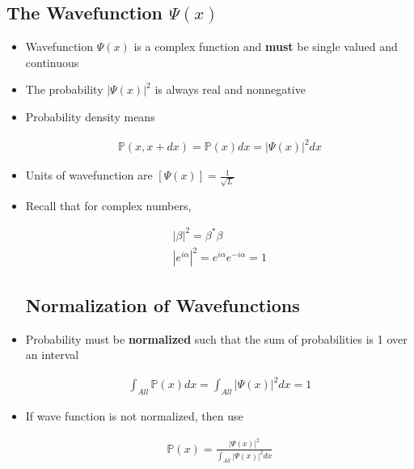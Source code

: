 \documentclass[a4paper,12pt]{article}
\begin{document}
\subsection{The Wavefunction $\Psi(x)$}
\begin{itemize}
  \item Wavefunction $\Psi(x)$ is a complex function and \textbf{must} be single valued and continuous
  \item The probability $|\Psi(x)|^2$ is always real and nonnegative
  \item Probability density means

  \begin{align}
    \mathbb{P}(x, x+dx) = \mathbb{P}(x)dx = |\Psi(x)|^2dx
  \end{align}

  \item Units of wavefunction are $[\Psi(x)] = \frac{1}{\sqrt{L}}$
  \item Recall that for complex numbers,

  \begin{align}
    |\beta|^2 = \beta^* \beta \\
    |e^{i\alpha}|^2 = e^{i\alpha}e^{-i\alpha} = 1
  \end{align}

\subsection{Normalization of Wavefunctions}

  \item Probability must be \textbf{normalized} such that the sum of probabilities is 1 over an interval

  \begin{align}
    \int_{All} \mathbb{P}(x)dx = \int_{All} |\Psi(x)|^2dx = 1
  \end{align}

  \item If wave function is not normalized, then use

  \begin{align}
    \mathbb{P}(x) = \frac{|\Psi(x)|^2}{\int_{All} |\Psi(x)|^2dx}
  \end{align}

\end{itemize}
\end{document}
